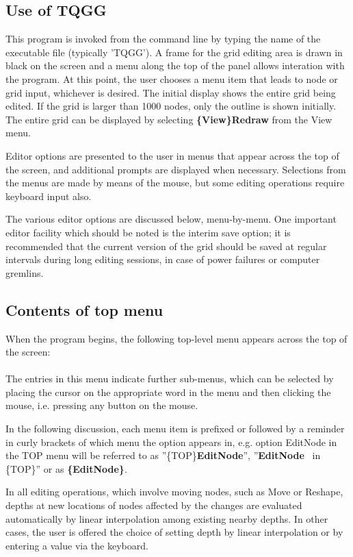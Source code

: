 \documentclass{article}
\begin{document}
\subsection{Use of TQGG}
This program is invoked from the command line by typing the name of the executable file (typically 'TQGG'). A frame for the grid editing area is drawn in black on the screen and a menu along the top of the panel allows interation with the program. At this point, the user chooses a menu item that leads to node or grid input, whichever is desired. The initial display shows the entire grid being edited.  If the grid is larger than 1000 nodes, only the outline is shown initially. The entire grid can be displayed by selecting \textbf{\{View\}Redraw} from the View menu.

Editor options are presented to the user in menus that appear across the top of the screen, and additional prompts are displayed when necessary. Selections from the menus are made by means of the mouse, but some editing operations require keyboard input also.

The various editor options are discussed below, menu-by-menu. One important editor facility which should be noted is the interim save option; it is recommended that the current version of the grid should be saved at regular intervals during long editing sessions, in case of power failures or computer gremlins.

\subsection{Contents of top menu}
When the program begins, the following top-level menu appears across the top of the screen:
\\

\noindent
{}
\\

The entries in this menu indicate further sub-menus, which can be selected by placing the cursor on the appropriate word in the menu and then clicking the mouse, i.e. pressing any button on the mouse.

In the following discussion, each menu item is prefixed or followed by a reminder in curly brackets of which menu the option appears in, e.g. option EditNode in the TOP menu will be referred to as ''\{TOP\}\textbf{EditNode{}}'', ''\textbf{EditNode} \ in \{TOP\}'' or as \textbf{\{EditNode\}}.

In all editing operations, which involve moving nodes, such as Move or Reshape, depths at new locations of nodes affected by the changes are evaluated automatically by linear interpolation among existing nearby depths. In other cases, the user is offered the choice of setting depth by linear interpolation or by entering a value via the keyboard.
\end{document}

